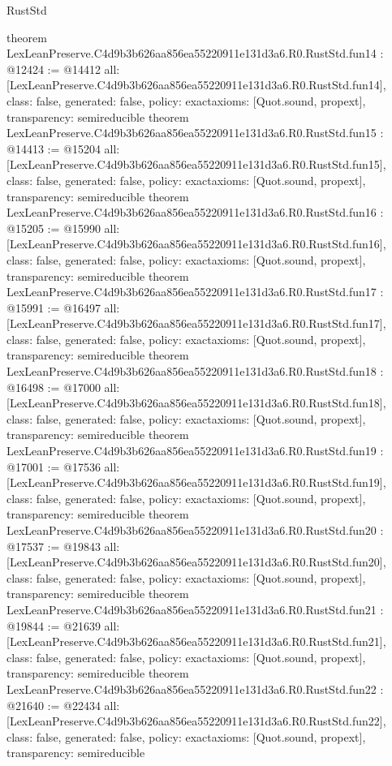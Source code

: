 \begin{lexlean}{RustStd}
\begin{coremodule}
{}
theorem LexLeanPreserve.C4d9b3b626aa856ea55220911e131d3a6.R0.RustStd.fun14 : @12424 := @14412 {
  all: [LexLeanPreserve.C4d9b3b626aa856ea55220911e131d3a6.R0.RustStd.fun14],
  class: false,
  generated: false,
  policy: exact{axioms: [Quot.sound, propext]},
  transparency: semireducible
}
theorem LexLeanPreserve.C4d9b3b626aa856ea55220911e131d3a6.R0.RustStd.fun15 : @14413 := @15204 {
  all: [LexLeanPreserve.C4d9b3b626aa856ea55220911e131d3a6.R0.RustStd.fun15],
  class: false,
  generated: false,
  policy: exact{axioms: [Quot.sound, propext]},
  transparency: semireducible
}
theorem LexLeanPreserve.C4d9b3b626aa856ea55220911e131d3a6.R0.RustStd.fun16 : @15205 := @15990 {
  all: [LexLeanPreserve.C4d9b3b626aa856ea55220911e131d3a6.R0.RustStd.fun16],
  class: false,
  generated: false,
  policy: exact{axioms: [Quot.sound, propext]},
  transparency: semireducible
}
theorem LexLeanPreserve.C4d9b3b626aa856ea55220911e131d3a6.R0.RustStd.fun17 : @15991 := @16497 {
  all: [LexLeanPreserve.C4d9b3b626aa856ea55220911e131d3a6.R0.RustStd.fun17],
  class: false,
  generated: false,
  policy: exact{axioms: [Quot.sound, propext]},
  transparency: semireducible
}
theorem LexLeanPreserve.C4d9b3b626aa856ea55220911e131d3a6.R0.RustStd.fun18 : @16498 := @17000 {
  all: [LexLeanPreserve.C4d9b3b626aa856ea55220911e131d3a6.R0.RustStd.fun18],
  class: false,
  generated: false,
  policy: exact{axioms: [Quot.sound, propext]},
  transparency: semireducible
}
theorem LexLeanPreserve.C4d9b3b626aa856ea55220911e131d3a6.R0.RustStd.fun19 : @17001 := @17536 {
  all: [LexLeanPreserve.C4d9b3b626aa856ea55220911e131d3a6.R0.RustStd.fun19],
  class: false,
  generated: false,
  policy: exact{axioms: [Quot.sound, propext]},
  transparency: semireducible
}
theorem LexLeanPreserve.C4d9b3b626aa856ea55220911e131d3a6.R0.RustStd.fun20 : @17537 := @19843 {
  all: [LexLeanPreserve.C4d9b3b626aa856ea55220911e131d3a6.R0.RustStd.fun20],
  class: false,
  generated: false,
  policy: exact{axioms: [Quot.sound, propext]},
  transparency: semireducible
}
theorem LexLeanPreserve.C4d9b3b626aa856ea55220911e131d3a6.R0.RustStd.fun21 : @19844 := @21639 {
  all: [LexLeanPreserve.C4d9b3b626aa856ea55220911e131d3a6.R0.RustStd.fun21],
  class: false,
  generated: false,
  policy: exact{axioms: [Quot.sound, propext]},
  transparency: semireducible
}
theorem LexLeanPreserve.C4d9b3b626aa856ea55220911e131d3a6.R0.RustStd.fun22 : @21640 := @22434 {
  all: [LexLeanPreserve.C4d9b3b626aa856ea55220911e131d3a6.R0.RustStd.fun22],
  class: false,
  generated: false,
  policy: exact{axioms: [Quot.sound, propext]},
  transparency: semireducible
}
\end{coremodule}
\end{lexlean}
